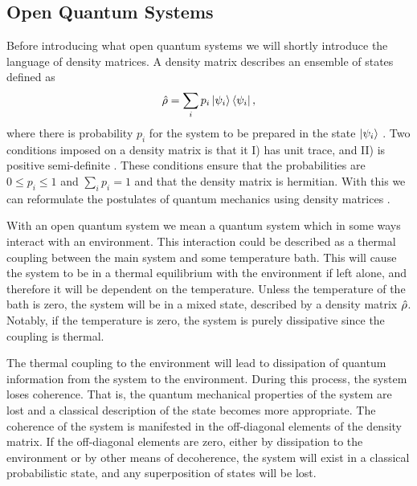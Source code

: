 \subsection{Open Quantum Systems} \label{sec:open}
Before introducing what open quantum systems we will shortly introduce the language of density matrices. A density matrix describes an ensemble of states defined as 
\begin{equation}
    \hat{\rho} = \sum_i p_i \ket{\psi_i} \bra{\psi_i},
\end{equation}
where there is probability $p_i$ for the system to be prepared in the state $\ket{\psi_i}$ \cite{Nielsen:2010}. Two conditions imposed on a density matrix is that it I) has unit trace, and II) is positive semi-definite \cite{Nielsen:2010}. These conditions ensure that the probabilities are $0 \leq p_i \leq 1$ and $\sum_i p_i = 1$ and that the density matrix is hermitian. With this we can reformulate the postulates of quantum mechanics using density matrices \cite{Nielsen:2010}.

With an open quantum system we mean a quantum system which in some ways interact with an environment. This interaction could be described as a thermal coupling between the main system and some temperature bath. This will cause the system to be in a thermal equilibrium with the environment if left alone, and therefore it will be dependent on the temperature. Unless the temperature of the bath is zero, the system will be in a mixed state, described by a density matrix $\hat{\rho}$. Notably, if the temperature is zero, the system is purely dissipative since the coupling is thermal. \cite{Annby-Andersson:2024}

The thermal coupling to the environment will lead to dissipation of quantum information from the system to the environment. During this process, the system loses coherence. That is, the quantum mechanical properties of the system are lost and a classical description of the state becomes more appropriate. The coherence of the system is manifested in the off-diagonal elements of the density matrix. If the off-diagonal elements are zero, either by dissipation to the environment or by other means of decoherence, the system will exist in a classical probabilistic state, and any superposition of states will be lost. \cite{Annby-Andersson:2024}

